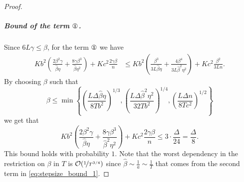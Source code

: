 \documentclass[a4paper,11pt]{article}
\begin{document}
\begin{proof}
    \subparagraph{Bound of the term $\circledOne$.} Since $6L\gamma \leq \beta$, for the term $\circledOne$ we have 
    \begin{align*}
        K b^2\left(\frac{2\beta^2\gamma}{\hat{\beta}\eta} + \frac{8\gamma\beta^3}{\hat{\beta}\eta^2}\right)
        + Kc^2\frac{2\gamma\beta}{n}&
        \le K b^2\left(\frac{\beta^{3}}{3L\hat{\beta}\eta} + \frac{4\beta^4}{3L\hat{\beta}^2\eta^2}\right)
        + Kc^2\frac{\beta^2}{3Ln}.
    \end{align*}
    By choosing $\beta$ such that 
    \begin{equation}\label{eq:stepsize_bound_1}
    \beta \le \min\left\{
    \left(\frac{L\Delta\hat{\beta}\eta}{8Tb^2}\right)^{1/3},
    \left(\frac{L\Delta\hat{\beta}^2\eta^2}{32Tb^2}\right)^{1/4},
    \left(\frac{L\Delta n}{8Tc^2}\right)^{1/2}
    \right\}
    \end{equation}
    we get that 
    \[
        K b^2\left(\frac{2\beta^2\gamma}{\hat{\beta}\eta} + \frac{8\gamma\beta^3}{\hat{\beta}^2\eta^2}\right)
        + Kc^2\frac{2\gamma\beta}{n} \le 3 \cdot \frac{\Delta}{24} = \frac{\Delta}{8}.
    \]
    This bound holds with probability $1.$ Note that the worst dependency in the restriction on $\beta$ in $T$ is $\mathcal O(\nicefrac{1}{T^{3/4}})$ since $\hat{\beta} \sim \frac{1}{a} \sim \frac{1}{T}$ that comes from the second term in \eqref{eq:stepsize_bound_1}.



\end{proof}
\end{document}
